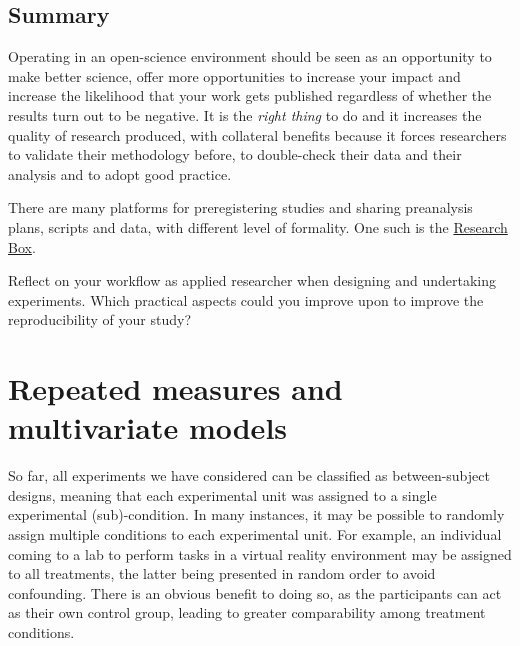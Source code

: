 \documentclass[
  11pt,
  letterpaper,
]{scrbook}
\theoremstyle{definition}
\theoremstyle{remark}
\begin{document}
\hypertarget{summary-3}{%
\section{Summary}\label{summary-3}}

Operating in an open-science environment should be seen as an
opportunity to make better science, offer more opportunities to increase
your impact and increase the likelihood that your work gets published
regardless of whether the results turn out to be negative. It is the
\emph{right thing} to do and it increases the quality of research
produced, with collateral benefits because it forces researchers to
validate their methodology before, to double-check their data and their
analysis and to adopt good practice.

There are many platforms for preregistering studies and sharing
preanalysis plans, scripts and data, with different level of formality.
One such is the \href{https://researchbox.org/}{Research Box}.

\begin{tcolorbox}[enhanced jigsaw, breakable, toptitle=1mm, left=2mm, bottomrule=.15mm, colframe=quarto-callout-tip-color-frame, colback=white, rightrule=.15mm, title=\textcolor{quarto-callout-tip-color}{\faLightbulb}\hspace{0.5em}{Your turn}, opacityback=0, toprule=.15mm, titlerule=0mm, colbacktitle=quarto-callout-tip-color!10!white, bottomtitle=1mm, arc=.35mm, coltitle=black, opacitybacktitle=0.6, leftrule=.75mm]

Reflect on your workflow as applied researcher when designing and
undertaking experiments. Which practical aspects could you improve upon
to improve the reproducibility of your study?

\end{tcolorbox}


\hypertarget{repeated-measures-and-multivariate-models}{%
\chapter{Repeated measures and multivariate
models}\label{repeated-measures-and-multivariate-models}}

So far, all experiments we have considered can be classified as
between-subject designs, meaning that each experimental unit was
assigned to a single experimental (sub)-condition. In many instances, it
may be possible to randomly assign multiple conditions to each
experimental unit. For example, an individual coming to a lab to perform
tasks in a virtual reality environment may be assigned to all
treatments, the latter being presented in random order to avoid
confounding. There is an obvious benefit to doing so, as the
participants can act as their own control group, leading to greater
comparability among treatment conditions.
\end{document}
